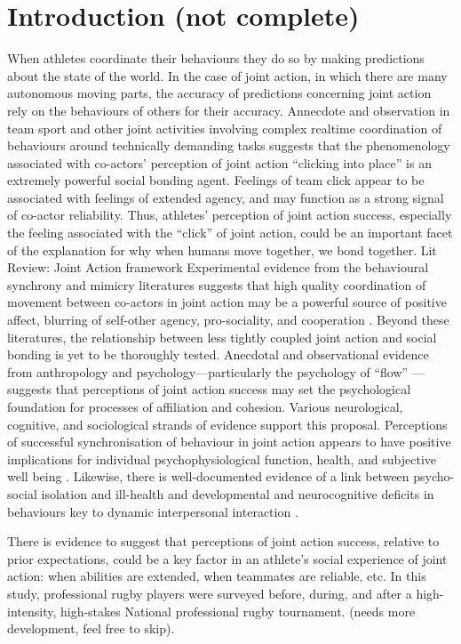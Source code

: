 \section{Introduction (not complete)}
When athletes coordinate their behaviours they do so by making predictions about the state of the world.  In the case of joint action, in which there are many autonomous moving parts, the accuracy of predictions concerning joint action rely on the behaviours of others for their accuracy.  Annecdote and observation in team sport and other joint activities involving complex realtime coordination of behaviours around technically demanding tasks suggests that the phenomenology associated with co-actors' perception of joint action ``clicking into place'' is an extremely powerful social bonding agent.  Feelings of team click appear to be associated with feelings of extended agency, and may function as a strong signal of co-actor reliability.  Thus, athletes' perception of joint action success, especially the feeling associated with the ``click'' of joint action, could be an important facet of the explanation for why when humans move together, we bond together.
Lit Review: Joint Action framework
Experimental evidence from the behavioural synchrony and mimicry literatures suggests that high quality coordination of movement between co-actors in joint action may be a powerful source of positive affect, blurring of self-other agency, pro-sociality, and cooperation \citep{Mogan2017}. Beyond these literatures, the relationship between less tightly coupled joint action and social bonding is yet to be thoroughly tested.  Anecdotal and observational evidence from anthropology and psychology---particularly the psychology of ``flow'' \citep{Csikszentmihalyi1992,Jackson1999}---suggests that perceptions of joint action success may set the psychological foundation for processes of affiliation and cohesion.  Various neurological, cognitive, and sociological strands of evidence support this proposal.  Perceptions of successful synchronisation of behaviour in joint action appears to have positive implications for individual psychophysiological function, health, and subjective well being \citep{Wheatley2012}.  Likewise, there is well-documented evidence of a link between psycho-social isolation and ill-health and developmental and neurocognitive deficits in behaviours key to dynamic interpersonal interaction \citep[e.g.][]{Blakemore2005,Baron-Cohen1991}.

There is evidence to suggest that perceptions of joint action success, relative to prior expectations, could be a key factor in an athlete's social experience of joint action: when abilities are extended, when teammates are reliable, etc. In this study, professional rugby players were surveyed before, during, and after a high-intensity, high-stakes National professional rugby tournament. (needs more development, feel free to skip).

